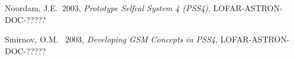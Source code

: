 \documentclass[12pt]{article}
\begin{document}
\begin{thebibliography}{99}

\newcommand{\bibref}[1]{\bibitem{#1}}

\newcommand{\biburl}[1]{ {\tt\mbox{#1}}}

\newcommand{\adassref}[8]{\bibref{#1} #2 #3, {\em #4}, 
    in ASP Conf. Ser., Vol. #5 {\em(ADASS #6)}, #7,\biburl{#8}}

\newcommand{\adassvii}[5]{\adassref{#1}{#2}{1998}{#3}{145}{VII}{#4}{#5}} 
\newcommand{\adassviii}[5]{\adassref{#1}{#2}{1999}{#3}{172}{VIII}{#4}{#5}} 
\newcommand{\adassix}[5]{\adassref{#1}{#2}{2000}{#3}{216}{IX}{#4}{#5}} 
\newcommand{\adassx}[5]{\adassref{#1}{#2}{2001}{#3}{238}{X}{#4}{#5}} 
\newcommand{\adassxii}[5]{\adassref{#1}{#2}{2003}{#3}{295}{XII}{#4}{#5}} 

\bibref{PSS4}Noordam, J.E.\ 2003, {\em Prototype Selfcal System 4 (PSS4)}, 
LOFAR-ASTRON-DOC-?????

\bibref{GSM}Smirnov, O.M. \ 2003, {\em Developing GSM Concepts in PSS4}, 
LOFAR-ASTRON-DOC-?????

\end{thebibliography}
\end{document}
